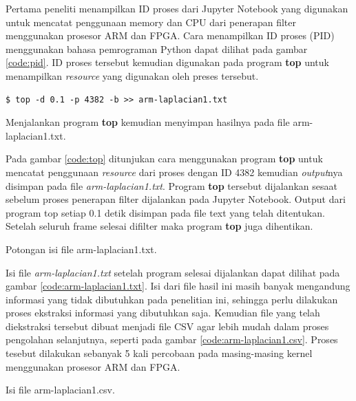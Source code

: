 Pertama peneliti menampilkan ID proses dari Jupyter Notebook yang digunakan untuk mencatat penggunaan memory dan CPU dari penerapan filter menggunakan prosesor ARM dan FPGA. Cara menampilkan ID proses (PID) menggunakan bahasa pemrograman Python dapat dilihat pada gambar \ref{code:pid}. ID proses tersebut kemudian digunakan pada program \textbf{top} untuk menampilkan \textit{resource} yang digunakan oleh preses tersebut. 

\begin{afigure}
    \begin{lstlisting}[frame=single, style=shell] 
    $ top -d 0.1 -p 4382 -b >> arm-laplacian1.txt    
    \end{lstlisting}
    \caption{Menjalankan program \textbf{top} kemudian menyimpan hasilnya pada file arm-laplacian1.txt.}
    \label{code:top}
\end{afigure}

Pada gambar \ref{code:top} ditunjukan cara menggunakan program \textbf{top} untuk mencatat penggunaan \textit{resource} dari proses dengan ID 4382 kemudian \textit{output}nya disimpan pada file \textit{arm-laplacian1.txt}. Program \textbf{top} tersebut dijalankan sesaat sebelum proses penerapan filter dijalankan pada Jupyter Notebook. Output dari program top setiap 0.1 detik disimpan pada file text yang telah ditentukan. Setelah seluruh frame selesai difilter maka program \textbf{top} juga dihentikan.

\begin{afigure}
    
    \caption{Potongan isi file arm-laplacian1.txt.}
    \label{code:arm-laplacian1.txt}
\end{afigure}

Isi file \textit{arm-laplacian1.txt} setelah program selesai dijalankan dapat dilihat pada gambar \ref{code:arm-laplacian1.txt}. Isi dari file hasil ini masih banyak mengandung informasi yang tidak dibutuhkan pada penelitian ini, sehingga perlu dilakukan proses ekstraksi informasi yang dibutuhkan saja. Kemudian file yang telah diekstraksi tersebut dibuat menjadi file CSV agar lebih mudah dalam proses pengolahan selanjutnya, seperti pada gambar \ref{code:arm-laplacian1.csv}. Proses tesebut dilakukan sebanyak 5 kali percobaan pada masing-masing kernel menggunakan prosesor ARM dan FPGA.

\begin{afigure}
    
    \caption{Isi file arm-laplacian1.csv.}
    \label{code:arm-laplacian1.csv}
\end{afigure}


